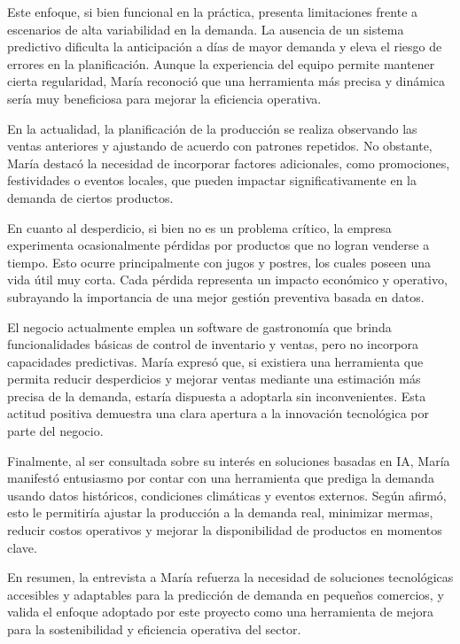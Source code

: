 \indent Este enfoque, si bien funcional en la práctica, presenta limitaciones frente a escenarios de alta variabilidad en la demanda. La ausencia de un sistema predictivo dificulta la anticipación a días de mayor demanda y eleva el riesgo de errores en la planificación. Aunque la experiencia del equipo permite mantener cierta regularidad, María reconoció que una herramienta más precisa y dinámica sería muy beneficiosa para mejorar la eficiencia operativa.

\indent En la actualidad, la planificación de la producción se realiza observando las ventas anteriores y ajustando de acuerdo con patrones repetidos. No obstante, María destacó la necesidad de incorporar factores adicionales, como promociones, festividades o eventos locales, que pueden impactar significativamente en la demanda de ciertos productos.

\indent En cuanto al desperdicio, si bien no es un problema crítico, la empresa experimenta ocasionalmente pérdidas por productos que no logran venderse a tiempo. Esto ocurre principalmente con jugos y postres, los cuales poseen una vida útil muy corta. Cada pérdida representa un impacto económico y operativo, subrayando la importancia de una mejor gestión preventiva basada en datos.

\indent El negocio actualmente emplea un software de gastronomía que brinda funcionalidades básicas de control de inventario y ventas, pero no incorpora capacidades predictivas. María expresó que, si existiera una herramienta que permita reducir desperdicios y mejorar ventas mediante una estimación más precisa de la demanda, estaría dispuesta a adoptarla sin inconvenientes. Esta actitud positiva demuestra una clara apertura a la innovación tecnológica por parte del negocio.

\indent Finalmente, al ser consultada sobre su interés en soluciones basadas en IA, María manifestó entusiasmo por contar con una herramienta que prediga la demanda usando datos históricos, condiciones climáticas y eventos externos. Según afirmó, esto le permitiría ajustar la producción a la demanda real, minimizar mermas, reducir costos operativos y mejorar la disponibilidad de productos en momentos clave.

\indent En resumen, la entrevista a María refuerza la necesidad de soluciones tecnológicas accesibles y adaptables para la predicción de demanda en pequeños comercios, y valida el enfoque adoptado por este proyecto como una herramienta de mejora para la sostenibilidad y eficiencia operativa del sector.


